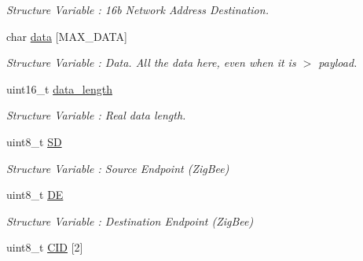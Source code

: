 \begin{DoxyCompactItemize}
\begin{DoxyCompactList}\small\item\em Structure Variable \+: 16b Network Address Destination. \end{DoxyCompactList}\item 
char \hyperlink{structpacket_x_bee_a1edd8058704f00a8549d8cad39351768}{data} \mbox{[}M\+A\+X\+\_\+\+D\+A\+TA\mbox{]}\hypertarget{structpacket_x_bee_a1edd8058704f00a8549d8cad39351768}{}\label{structpacket_x_bee_a1edd8058704f00a8549d8cad39351768}

\begin{DoxyCompactList}\small\item\em Structure Variable \+: Data. All the data here, even when it is $>$ payload. \end{DoxyCompactList}\item 
uint16\+\_\+t \hyperlink{structpacket_x_bee_a223e4e2815c74d45fdc277fa50c0a68b}{data\+\_\+length}\hypertarget{structpacket_x_bee_a223e4e2815c74d45fdc277fa50c0a68b}{}\label{structpacket_x_bee_a223e4e2815c74d45fdc277fa50c0a68b}

\begin{DoxyCompactList}\small\item\em Structure Variable \+: Real data length. \end{DoxyCompactList}\item 
uint8\+\_\+t \hyperlink{structpacket_x_bee_a3c70361d3610e26c3dfcd2342383b058}{SD}\hypertarget{structpacket_x_bee_a3c70361d3610e26c3dfcd2342383b058}{}\label{structpacket_x_bee_a3c70361d3610e26c3dfcd2342383b058}

\begin{DoxyCompactList}\small\item\em Structure Variable \+: Source Endpoint (Zig\+Bee) \end{DoxyCompactList}\item 
uint8\+\_\+t \hyperlink{structpacket_x_bee_ab0acfcf3e6da62cfd31da8c383a93b15}{DE}\hypertarget{structpacket_x_bee_ab0acfcf3e6da62cfd31da8c383a93b15}{}\label{structpacket_x_bee_ab0acfcf3e6da62cfd31da8c383a93b15}

\begin{DoxyCompactList}\small\item\em Structure Variable \+: Destination Endpoint (Zig\+Bee) \end{DoxyCompactList}\item 
uint8\+\_\+t \hyperlink{structpacket_x_bee_a2671a7535f09357a8b1f79aaa0999035}{C\+ID} \mbox{[}2\mbox{]}\hypertarget{structpacket_x_bee_a2671a7535f09357a8b1f79aaa0999035}{}\label{structpacket_x_bee_a2671a7535f09357a8b1f79aaa0999035}


\end{DoxyCompactItemize}
